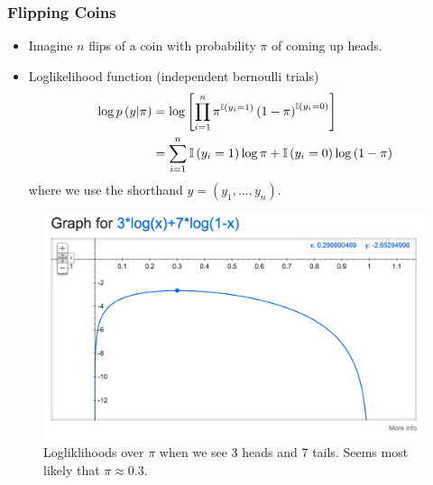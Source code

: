 \documentclass[10pt,mathserif]{beamer}
\begin{document}
\begin{frame}
  \frametitle{Flipping Coins}
  \begin{itemize}
  \item Imagine $n$ flips of a coin with probability $\pi$ of coming up heads.
  \item Loglikelihood function (independent bernoulli trials)
    \begin{align*}
      \log p\left(y \vert \pi \right) &= \log \left[\prod_{i = 1}^{n} \pi^{\mathbb{I}\left({y_i = 1}\right)}\left(1 - \pi\right)^{\mathbb{I}\left({y_i = 0}\right)}\right] \\
      &= \sum_{i = 1}^{n} \mathbb{I}\left({y_i = 1}\right)\log \pi + \mathbb{I}\left({y_i = 0}\right)\log\left(1 - \pi\right)
    \end{align*}
    where we use the shorthand $y = \left(y_1, \dots, y_n\right)$.
  \end{itemize}
  \begin{figure}[ht]
    \centering
    \includegraphics[width=0.3\paperwidth]{figure/loglikelihood_bernoulli_10}
    \caption{Logliklihoods over $\pi$ when we see 3 heads and 7 tails. Seems
      most likely that $\pi \approx 0.3$. \label{fig:loglikelihood_bernoulli_10} }
  \end{figure}
\end{frame}
\end{document}
